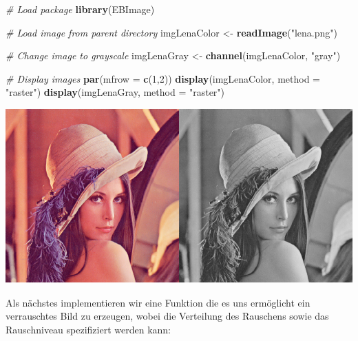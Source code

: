 \documentclass[10pt,]{article}
\newenvironment{Shaded}{\begin{snugshade}}{\end{snugshade}}
\newcommand{\KeywordTok}[1]{\textcolor[rgb]{0.13,0.29,0.53}{\textbf{{#1}}}}
\newcommand{\DataTypeTok}[1]{\textcolor[rgb]{0.13,0.29,0.53}{{#1}}}
\newcommand{\DecValTok}[1]{\textcolor[rgb]{0.00,0.00,0.81}{{#1}}}
\newcommand{\StringTok}[1]{\textcolor[rgb]{0.31,0.60,0.02}{{#1}}}
\newcommand{\CommentTok}[1]{\textcolor[rgb]{0.56,0.35,0.01}{\textit{{#1}}}}
\newcommand{\NormalTok}[1]{{#1}}
\begin{document}
\begin{Shaded}
\begin{Highlighting}[]
\CommentTok{# Load package}
\KeywordTok{library}\NormalTok{(EBImage)}

\CommentTok{# Load image from parent directory}
\NormalTok{imgLenaColor <-}\StringTok{ }\KeywordTok{readImage}\NormalTok{(}\StringTok{"lena.png"}\NormalTok{)}

\CommentTok{# Change image to grayscale}
\NormalTok{imgLenaGray <-}\StringTok{ }\KeywordTok{channel}\NormalTok{(imgLenaColor, }\StringTok{"gray"}\NormalTok{)}

\CommentTok{# Display images}
\KeywordTok{par}\NormalTok{(}\DataTypeTok{mfrow =} \KeywordTok{c}\NormalTok{(}\DecValTok{1}\NormalTok{,}\DecValTok{2}\NormalTok{))}
\KeywordTok{display}\NormalTok{(imgLenaColor, }\DataTypeTok{method =} \StringTok{"raster"}\NormalTok{)}
\KeywordTok{display}\NormalTok{(imgLenaGray, }\DataTypeTok{method =} \StringTok{"raster"}\NormalTok{)}
\end{Highlighting}
\end{Shaded}

\includegraphics{project2_files/figure-latex/Load and prepare images-1.pdf}

Als nächstes implementieren wir eine Funktion die es uns ermöglicht ein
verrauschtes Bild zu erzeugen, wobei die Verteilung des Rauschens sowie
das Rauschniveau spezifiziert werden kann:
\end{document}
